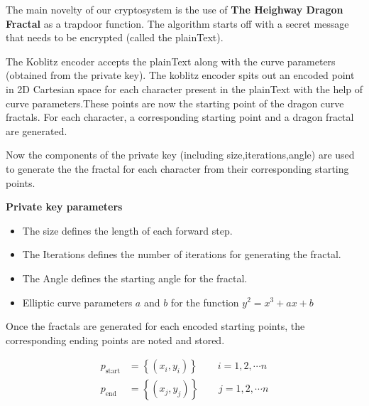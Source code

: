 \documentclass[a4paper,12pt]{article}
\begin{document}
\begin{flushleft}
The main novelty of our cryptosystem is the use of \textbf{The Heighway Dragon Fractal} as a trapdoor function. The algorithm starts off with a secret message that needs to be encrypted (called the plainText).
\end{flushleft}

\begin{flushleft}
The Koblitz encoder accepts the plainText along with the curve parameters (obtained from the private key). The koblitz encoder spits out an encoded point in 2D Cartesian space for each character present in the plainText with the help of curve parameters.These points are now the starting point of the dragon curve fractals. For each character, a corresponding starting point and a dragon fractal are generated.
\end{flushleft}

\begin{flushleft}
Now the components of the private key (including size,iterations,angle) are used to generate the the fractal for each character from their corresponding starting points.
\end{flushleft}

\begin{flushleft}
\textbf{Private key parameters}
\begin{itemize}
	\item The size defines the length of each forward step.
	\item The Iterations defines the number of iterations for generating the fractal.
	\item The Angle defines the starting angle for the fractal.
	\item Elliptic curve parameters $a$ and $b$ for the function $y^2=x^3+ax+b$
\end{itemize}
\end{flushleft}

\begin{flushleft}
Once the fractals are generated for each encoded starting points, the corresponding ending points are noted and stored.

\begin{align*}
	p_{\text{start}}&=\left\{(x_i,y_i)\right\}\qquad i=1,2,\cdots n\\
	p_{\text{end}}&=\left\{(x_j,y_j)\right\}\qquad j=1,2,\cdots n
\end{align*}
\end{flushleft}
\end{document}

